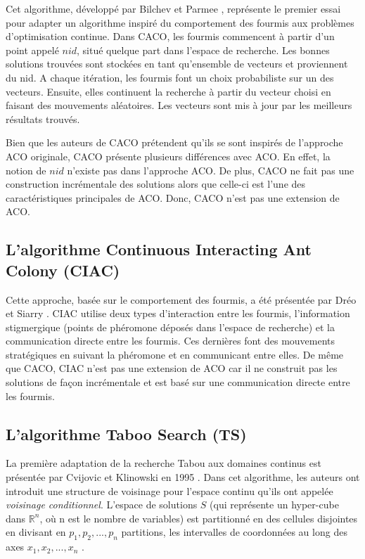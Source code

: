 Cet algorithme, développé par Bilchev et Parmee \cite{bilchev1995ant}, représente le premier essai pour adapter un algorithme inspiré du comportement des fourmis aux problèmes d'optimisation continue. Dans CACO, les fourmis commencent à partir d'un point appelé $nid$, situé quelque part dans l'espace de recherche. Les bonnes solutions trouvées sont stockées en tant qu'ensemble de vecteurs et proviennent du nid. A chaque itération, les fourmis font un choix probabiliste sur un des vecteurs. Ensuite, elles continuent la recherche à partir du vecteur choisi en faisant des mouvements aléatoires. Les vecteurs sont mis à jour par les meilleurs résultats trouvés. 

Bien que les auteurs de CACO prétendent qu'ils se sont inspirés de l'approche ACO originale, CACO présente plusieurs différences avec ACO. En effet, la notion de $nid$ n'existe pas dans l'approche ACO. De plus, CACO ne fait pas une construction incrémentale des solutions alors que celle-ci est l'une des caractéristiques principales de ACO. Donc, CACO n'est pas une extension de ACO.  

\subsection{L'algorithme Continuous Interacting Ant Colony (CIAC)}

Cette approche, basée sur le comportement des fourmis, a été présentée par Dréo et Siarry \cite{dreo2004continuous}. CIAC utilise deux types d'interaction entre les fourmis, l'information stigmergique (points de phéromone déposés dans l'espace de recherche) et la communication directe entre les fourmis. Ces dernières font des mouvements stratégiques en suivant la phéromone et en communicant entre elles. De même que CACO, CIAC n'est pas une extension de ACO car il ne construit pas les solutions de façon incrémentale et est basé sur une communication directe entre les fourmis.

\subsection{L'algorithme Taboo Search (TS)}
La première adaptation de la recherche Tabou aux domaines continus est présentée par Cvijovic et Klinowski en 1995 \cite{cvijovic1995taboo}. Dans cet algorithme, les auteurs ont introduit une structure de voisinage pour l'espace continu qu'ils ont appelée \emph{voisinage conditionnel}. L'espace de solutions $S$ (qui représente un hyper-cube dans $\mathbb{R}^n$, où n est le nombre de variables) est partitionné en des cellules disjointes en divisant en $p_1, p_2,...,p_n$ partitions, les intervalles de coordonnées au long des axes $x_1, x_2,...,x_n$ .

